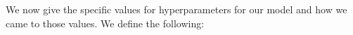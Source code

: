 \documentclass[11pt]{amsart}
\begin{document}
We now give the specific values for hyperparameters for our model and how we came to those values. We define the following:

\end{document}

